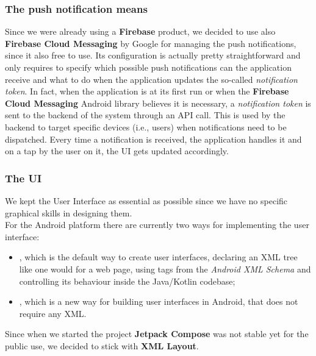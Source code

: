 \documentclass[../../main]{subfiles}
\begin{document}
\subsubsection{The push notification means}
Since we were already using a \textbf{Firebase} product, we decided to use also \textbf{Firebase Cloud Messaging} by Google for managing the push notifications, since it also free to use.
Its configuration is actually pretty straightforward and only requires to specify which possible push notifications can the application receive and what to do when the application updates the so-called \textit{notification token}.
In fact, when the application is at its first run or when the \textbf{Firebase Cloud Messaging} Android library believes it is necessary, a \textit{notification token} is sent to the backend of the system through an API call.
This is used by the backend to target specific devices (i.e., users) when notifications need to be dispatched.
Every time a notification is received, the application handles it and on a tap by the user on it, the UI gets updated accordingly.

\subsubsection{The UI}
We kept the User Interface as essential as possible since we have no specific graphical skills in designing them.\\
For the Android platform there are currently two ways for implementing the user interface:
\begin{itemize}
    \item {}, which is the default way to create user interfaces, declaring an XML tree like one would for a web page, using tags from the \textit{Android XML Schema} and controlling its behaviour inside the Java/Kotlin codebase;
    \item {}, which is a new way for building user interfaces in Android, that does not require any XML.
\end{itemize}
Since when we started the project \textbf{Jetpack Compose} was not stable yet for the public use, we decided to stick with \textbf{XML Layout}.
\end{document}
